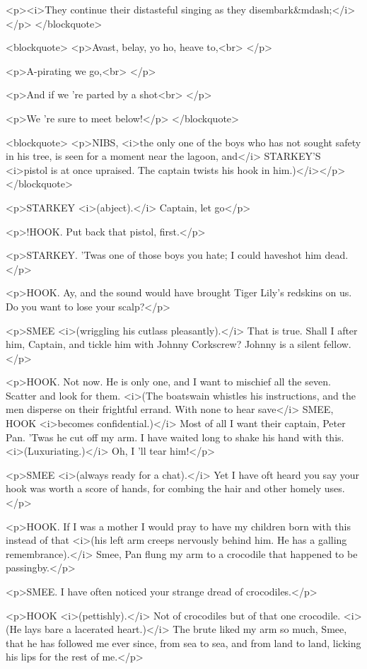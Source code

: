 <p><i>They continue their distasteful singing as they
disembark&mdash;</i></p>
</blockquote>

<blockquote>
<p>Avast, belay, yo ho, heave to,<br>
</p>

<p>A-pirating we go,<br>
</p>

<p>And if we 're parted by a shot<br>
</p>

<p>We 're sure to meet below!</p>
</blockquote>

<blockquote>
<p>NIBS, <i>the only one of the boys who has not sought safety in his
tree, is seen for a moment near the lagoon, and</i> STARKEY'S
<i>pistol is at once upraised. The captain twists his hook in
him.)</i></p>
</blockquote>

<p>STARKEY <i>(abject).</i> Captain, let go</p>

<p>!HOOK. Put back that pistol, first.</p>

<p>STARKEY. 'Twas one of those boys you hate; I could haveshot him
dead.</p>

<p>HOOK. Ay, and the sound would have brought Tiger Lily's redskins
on us. Do you want to lose your scalp?</p>

<p>SMEE <i>(wriggling his cutlass pleasantly).</i> That is true.
Shall I after him, Captain, and tickle him with Johnny Corkscrew?
Johnny is a silent fellow.</p>

<p>HOOK. Not now. He is only one, and I want to mischief all the
seven. Scatter and look for them. <i>(The boatswain whistles his
instructions, and the men disperse on their frightful errand. With
none to hear save</i> SMEE, HOOK <i>becomes confidential.)</i> Most
of all I want their captain, Peter Pan. 'Twas he cut off my arm. I
have waited long to shake his hand with this. <i>(Luxuriating.)</i>
Oh, I 'll tear him!</p>

<p>SMEE <i>(always ready for a chat).</i> Yet I have oft heard you
say your hook was worth a score of hands, for combing the hair and
other homely uses.</p>

<p>HOOK. If I was a mother I would pray to have my children born with
this instead of that <i>(his left arm creeps nervously behind him. He
has a galling remembrance).</i> Smee, Pan flung my arm to a crocodile
that happened to be passingby.</p>

<p>SMEE. I have often noticed your strange dread of crocodiles.</p>

<p>HOOK <i>(pettishly).</i> Not of crocodiles but of that one
crocodile. <i>(He lays bare a lacerated heart.)</i> The brute liked
my arm so much, Smee, that he has followed me ever since, from sea to
sea, and from land to land, licking his lips for the rest of me.</p>

